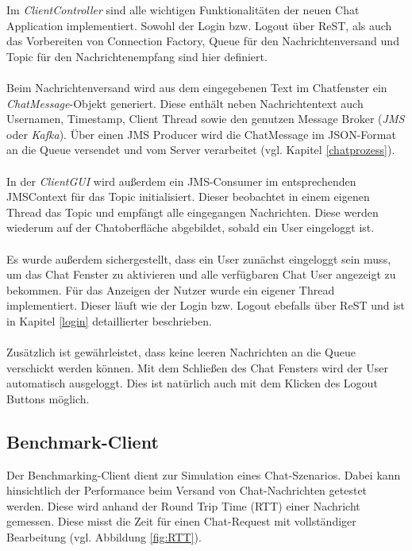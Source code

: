 \documentclass[10pt,journal,compsoc]{IEEEtran}
\begin{document}
Im {\textit{ClientController}} sind alle wichtigen Funktionalitäten der neuen Chat Application implementiert. Sowohl der Login bzw. Logout über ReST, als auch das Vorbereiten von Connection Factory, Queue für den Nachrichtenversand und Topic für den Nachrichtenempfang sind hier definiert.
\\
\\
Beim Nachrichtenversand wird aus dem eingegebenen Text im Chatfenster ein {\textit{ChatMessage}}-Objekt generiert. Diese enthält neben Nachrichtentext auch Usernamen, Timestamp, Client Thread sowie den genutzen Message Broker ({\textit{JMS}} oder {\textit{Kafka}}). Über einen JMS Producer wird die ChatMessage im JSON-Format an die Queue versendet und vom Server verarbeitet (vgl. Kapitel \ref{chatprozess}).
\\
\\
In der {\textit{ClientGUI}} wird außerdem ein JMS-Consumer im entsprechenden JMSContext für das Topic initialisiert. Dieser beobachtet in einem eigenen Thread das Topic und empfängt alle eingegangen Nachrichten. Diese werden wiederum auf der Chatoberfläche abgebildet, sobald ein User eingeloggt ist.
\\
\\
Es wurde außerdem sichergestellt, dass ein User zunächst eingeloggt sein muss, um das Chat Fenster zu aktivieren und alle verfügbaren Chat User angezeigt zu bekommen. Für das Anzeigen der Nutzer wurde ein eigener Thread implementiert. Dieser läuft wie der Login bzw. Logout ebefalls über ReST und ist in Kapitel \ref{login} detaillierter beschrieben.
\\
\\
Zusätzlich ist gewährleistet, dass keine leeren Nachrichten an die Queue verschickt werden können. Mit dem Schließen des Chat Fensters wird der User automatisch ausgeloggt. Dies ist natürlich auch mit dem Klicken des Logout Buttons möglich. 



\subsection{Benchmark-Client}

Der Benchmarking-Client dient zur Simulation eines Chat-Szenarios. Dabei kann hinsichtlich der Performance beim Versand von Chat-Nachrichten getestet werden. Diese wird anhand der Round Trip Time (RTT) einer Nachricht gemessen. Diese misst die Zeit für einen Chat-Request mit vollständiger Bearbeitung (vgl. Abbildung \ref{fig:RTT}). 
\end{document}
